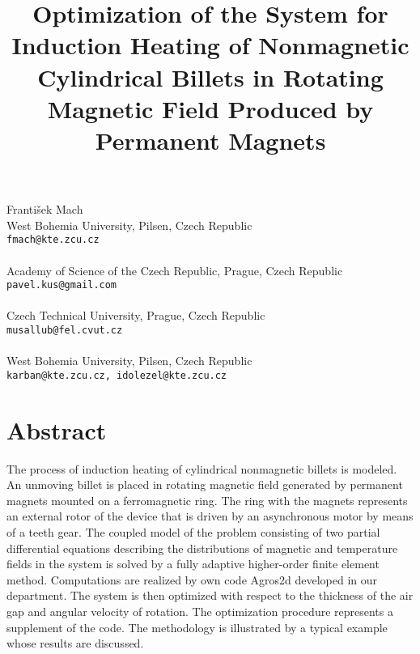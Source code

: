 
\title{Optimization of the System for Induction Heating of Nonmagnetic Cylindrical Billets in Rotating Magnetic Field Produced by Permanent Magnets}
 \author{} \institute{}
\maketitle
\begin{center}
{\large Franti\v sek Mach}\\
West Bohemia University, Pilsen, Czech Republic \\
{\tt fmach@kte.zcu.cz}
\\ \\
Academy of Science of the Czech Republic, Prague, Czech Republic\\
{\tt pavel.kus@gmail.com}
\\ \vspace{4mm}{\large Lubom\' ir Mus\' alek}\\
Czech Technical University, Prague, Czech Republic \\
{\tt musallub@fel.cvut.cz}
\\ \vspace{4mm}{\large Pavel Karban, Ivo Dole\v zel}\\
West Bohemia University, Pilsen, Czech Republic \\
{\tt karban@kte.zcu.cz, idolezel@kte.zcu.cz}

\end{center}

\section*{Abstract}

The process of induction heating of cylindrical nonmagnetic billets is modeled. An unmoving billet is placed in rotating magnetic field generated by permanent magnets mounted on a ferromagnetic ring. The ring with the magnets represents an external rotor of the device that is driven by an asynchronous motor by means of a teeth gear. The coupled model of the problem consisting of two partial differential equations describing the distributions of magnetic and temperature fields in the system is solved by a fully adaptive higher-order finite element method. Computations are realized by own code Agros2d developed in our department. The system is then optimized with respect to the thickness of the air gap and angular velocity of rotation. The optimization procedure represents a supplement of the code. The methodology is illustrated by a typical example whose results are discussed.

